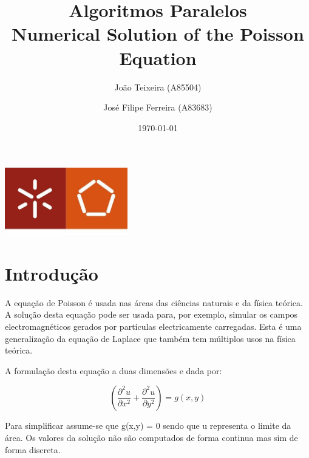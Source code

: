 \documentclass[a4paper]{report}
\begin{document}
\title{Algoritmos Paralelos\\Numerical Solution of the Poisson Equation}
\author{João Teixeira (A85504) \and José Filipe Ferreira (A83683)}
\date{\today}

\begin{center}
    \begin{minipage}{0.75\linewidth}
        \centering
        \includegraphics[width=0.4\textwidth]{images/eng.jpeg}\par\vspace{1cm}
        \vspace{1.5cm}
        \href{https://www.uminho.pt/PT}
        {\color{black}{\scshape\LARGE Universidade do Minho}} \par
        \vspace{1cm}
        \href{https://www.di.uminho.pt/}
        {\color{black}{\scshape\Large Departamento de Informática}} \par
        \vspace{1.5cm}
        \maketitle
    \end{minipage}
\end{center}

\tableofcontents

\pagebreak

\chapter{Introdução}
A equação de Poisson é usada nas áreas das ciências naturais e da física
teórica. A solução desta equação pode ser usada para, por exemplo, simular os
campos electromagnéticos gerados por partículas electricamente carregadas. Esta
é uma generalização da equação de Laplace que também tem múltiplos usos na
física teórica.

A formulação desta equação a duas dimensões e dada por:

\[ \left( \frac{\partial^2 u}{\partial x^2} + \frac{\partial^2 u}{\partial y^2} \right)= g(x, y) \]

Para simplificar assume-se que g(x,y) = 0 sendo que u representa o limite da
área. Os valores da solução não são computados de forma continua mas sim de
forma discreta.
\end{document}
